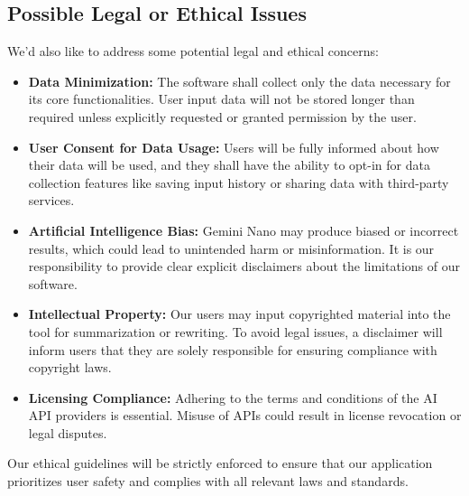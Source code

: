 \documentclass{article}
\begin{document}
\subsection{Possible Legal or Ethical Issues}
We'd also like to address some potential legal and ethical concerns:
\begin{itemize}
    \item \textbf{Data Minimization:} The software shall collect only the data necessary for its core functionalities. User input data will not be stored longer than required unless explicitly requested or granted permission by the user.
        \item \textbf{User Consent for Data Usage:} Users will be fully informed about how their data will be used, and they shall have the ability to opt-in for data collection features like saving input history or sharing data with third-party services.
    \item \textbf{Artificial Intelligence Bias:} Gemini Nano may produce biased or incorrect results, which could lead to unintended harm or misinformation. It is our responsibility to provide clear explicit disclaimers about the limitations of our software.
    \item \textbf{Intellectual Property:} Our users may input copyrighted material into the tool for summarization or rewriting. To avoid legal issues, a disclaimer will inform users that they are solely responsible for ensuring compliance with copyright laws.
    \item \textbf{Licensing Compliance:} Adhering to the terms and conditions of the AI API providers is essential. Misuse of APIs could result in license revocation or legal disputes.
\end{itemize}
Our ethical guidelines will be strictly enforced to ensure that our application prioritizes user safety and complies with all relevant laws and standards.
\end{document}
